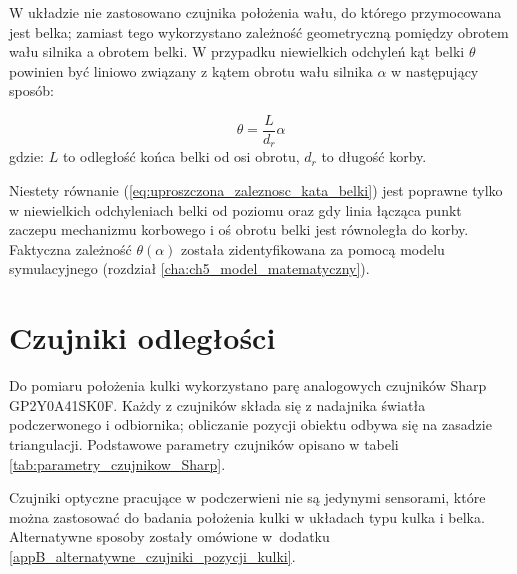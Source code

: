 W układzie nie zastosowano czujnika położenia wału, do którego przymocowana jest belka; zamiast tego wykorzystano zależność geometryczną pomiędzy obrotem wału silnika a obrotem belki. W przypadku niewielkich odchyleń kąt belki $\theta$ powinien być liniowo związany z kątem obrotu wału silnika $\alpha$ w następujący sposób:

\begin{equation}\label{eq:uproszczona_zaleznosc_kata_belki}
    \theta = \frac{L}{d_r} \alpha
\end{equation}
gdzie: $L$ to odległość końca belki od osi obrotu, $d_r$ to długość korby.

Niestety równanie (\ref{eq:uproszczona_zaleznosc_kata_belki}) jest poprawne tylko w niewielkich odchyleniach belki od poziomu oraz gdy linia łącząca punkt zaczepu mechanizmu korbowego i oś obrotu belki jest równoległa do korby. Faktyczna zależność $\theta(\alpha)$ została zidentyfikowana za pomocą modelu symulacyjnego (rozdział \ref{cha:ch5_model_matematyczny}).

\section{Czujniki odległości}
\label{sec:ch3_czujniki_odleglosci}

Do pomiaru położenia kulki wykorzystano parę analogowych czujników Sharp GP2Y0A41SK0F. Każdy z czujników składa się z nadajnika światła podczerwonego i odbiornika; obliczanie pozycji obiektu odbywa się na zasadzie triangulacji. Podstawowe parametry czujników opisano w tabeli \ref{tab:parametry_czujnikow_Sharp}.

Czujniki optyczne pracujące w podczerwieni nie są jedynymi sensorami, które można zastosować do badania położenia kulki w układach typu kulka i belka. Alternatywne sposoby zostały omówione w~dodatku \ref{appB_alternatywne_czujniki_pozycji_kulki}.

